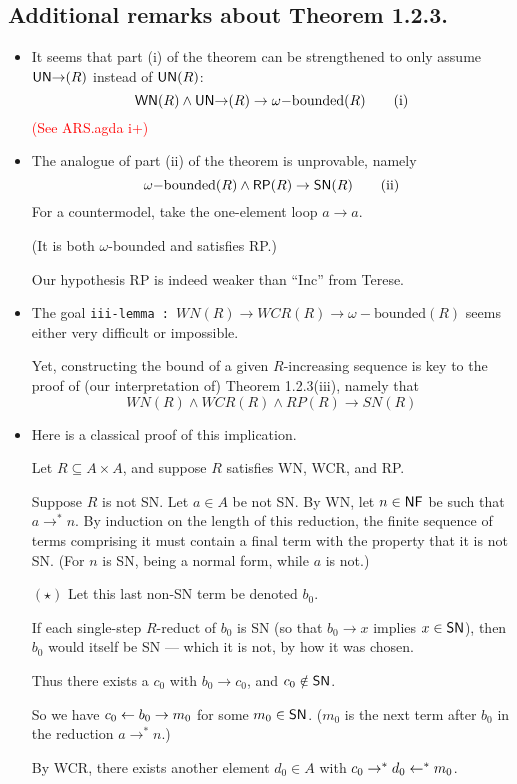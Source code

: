 \documentclass{scrartcl}
\begin{document}
\subsection*{Additional remarks about Theorem 1.2.3.}
\begin{itemize}
  \item It seems that part (i) of the theorem can be strengthened to only
  assume $\mathsf{UN}{\to}(R)$ instead of $\mathsf{UN}(R)$:
  \[ \mathsf{WN}(R) \land \mathsf{UN}{\to}(R) \to \omega{-}\text{bounded}(R) \tag{i} \]
  \textcolor{red}{(See ARS.agda i+)}
  \item The analogue of part (ii) of the theorem is unprovable, namely
  \[ \omega{-}\text{bounded}(R) \land \mathsf{RP}(R) \to \mathsf{SN}(R) \tag{ii}\]
  For a countermodel, take the one-element loop $a \to a$.

  (It is both $\omega${-}bounded and satisfies RP.)

  Our hypothesis RP is indeed weaker than ``Inc'' from Terese.
  \item The goal \texttt{iii-lemma :  $WN(R) \to WCR(R) \to \omega{-}\text{bounded}(R)$}
  seems either very difficult or impossible.

  Yet, constructing the bound of a given $R$-increasing sequence is key to the proof of
  (our interpretation of) Theorem 1.2.3(iii), namely that
  \[ WN(R) \land WCR(R) \land RP(R) \to SN(R) \tag{iii} \]
  \item Here is a classical proof of this implication.

  Let $R \subseteq A \times A$, and suppose $R$ satisfies WN, WCR, and RP.

  Suppose $R$ is not SN.  Let $a \in A$ be not SN.  By WN, let $n \in \mathsf{NF}$ be
  such that $a \to^* n$.  By induction on the length of this reduction, the finite sequence
  of terms comprising it must contain a final term with the property that
  it is not SN.  (For $n$ is SN, being a normal form, while $a$ is not.)

  $(\star)$ Let this last non-SN term be denoted $b_0$.

  If each single-step $R$-reduct of $b_0$ is SN (so that $b_0 \to x$ implies $x\in \mathsf{SN}$),
  then $b_0$ would itself be SN --- which it is not, by how it was chosen.

  Thus there exists a $c_0$ with $b_0 \to c_0$, and $c_0 \notin \mathsf{SN}$.

  So we have $c_0 \leftarrow b_0 \to m_0$ for some $m_0 \in \mathsf{SN}$. ($m_0$ is the next term after $b_0$ in the reduction $a \to^* n$.)

  By WCR, there exists another element $d_0 \in A$ with $c_0 \to^* d_0 \leftarrow^* m_0$.


\end{itemize}
\end{document}
